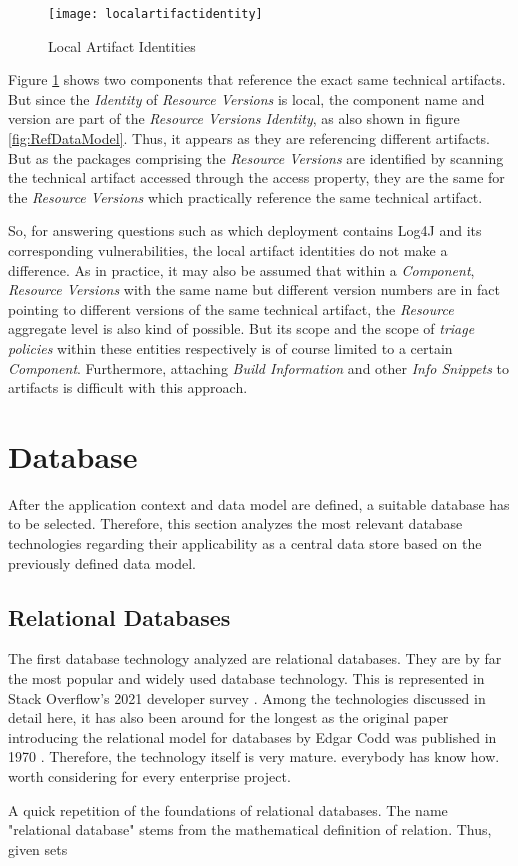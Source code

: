 \begin{figure}[H]
	\centering
	\texttt{[image: localartifactidentity]}
	\caption[Data Model]{Local Artifact Identities }
	\label{fig:LocalArtifactIdentity}
\end{figure}

Figure \ref{fig:LocalArtifactIdentity} shows two components that reference the exact same technical artifacts. But since the \emph{Identity} of \emph{Resource Versions} is local, the component name and version are part of the \emph{Resource Versions Identity}, as also shown in figure \ref{fig:RefDataModel}. Thus, it appears as they are referencing different artifacts. But as the packages comprising the \emph{Resource Versions} are identified by scanning the technical artifact accessed through the access property, they are the same for the \emph{Resource Versions} which practically reference the same technical artifact.\par 
So, for answering questions such as which deployment contains Log4J and its corresponding vulnerabilities, the local artifact identities do not make a difference. As in practice, it may also be assumed that within a \emph{Component}, \emph{Resource Versions} with the same name but different version numbers are in fact pointing to different versions of the same technical artifact, the \emph{Resource} aggregate level is also kind of possible. But its scope and the scope of \emph{triage policies} within these entities respectively is of course limited to a certain \emph{Component}. Furthermore, attaching \emph{Build Information} and other \emph{Info Snippets} to artifacts is difficult with this approach.


\section{Database}
After the application context and data model are defined, a suitable database has to be selected. Therefore, this section analyzes the most relevant database technologies regarding their applicability as a central data store based on the previously defined data model.


\subsection{Relational Databases}
The first database technology analyzed are relational databases. They are by far the most popular and widely used database technology. This is represented in Stack Overflow's 2021 developer survey \cite{StackoverflowDeveloperSurvey}. Among the technologies discussed in detail here, it has also been around for the longest as the original paper introducing the relational model for databases by Edgar Codd was published in 1970 \cite{RelationalDatabaseOriginalPaper}. Therefore, the technology itself is very mature. everybody has know how. worth considering for every enterprise project.\par
A quick repetition of the foundations of relational databases. The name "relational database" stems from the mathematical definition of relation. Thus, given sets 
